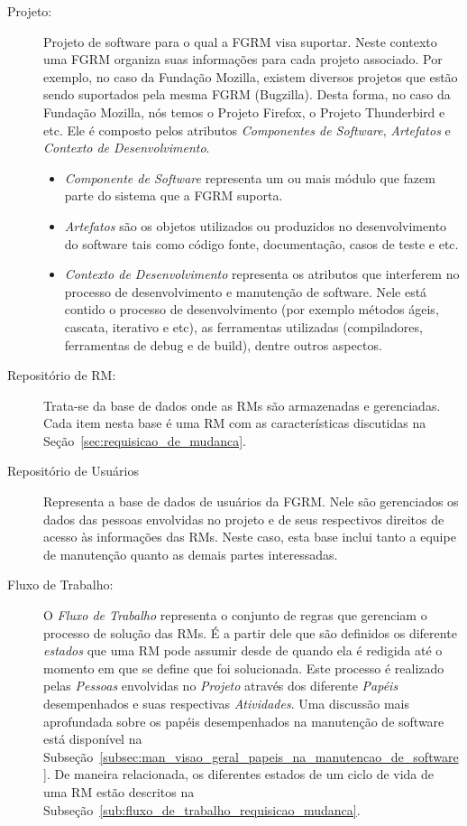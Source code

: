 \begin{description}
    \item[Projeto:] Projeto de software para o qual a FGRM visa suportar. Neste
        contexto uma FGRM organiza suas informações para cada projeto associado.
        Por exemplo, no caso da Fundação Mozilla, existem diversos projetos que
        estão sendo suportados pela mesma FGRM (Bugzilla). Desta forma, no caso
        da Fundação Mozilla, nós temos o Projeto Firefox, o Projeto Thunderbird
        e etc. Ele é composto pelos atributos \textit{Componentes de Software},
        \textit{Artefatos} e \textit{Contexto de Desenvolvimento}.
		\begin{itemize}
			\item  \textit{Componente de Software} representa um ou mais módulo
				que fazem parte do sistema que a FGRM suporta.
			\item \textit{Artefatos} são os objetos utilizados ou produzidos no
				desenvolvimento do software tais como código fonte,
				documentação, casos de teste e etc.
			\item \textit{Contexto de Desenvolvimento} representa os atributos
				que interferem no processo de desenvolvimento e manutenção de
				software. Nele está contido o processo de desenvolvimento (por
				exemplo métodos ágeis, cascata, iterativo e etc), as ferramentas
				utilizadas (compiladores, ferramentas de debug e de build), dentre
                outros aspectos.
		\end{itemize}
	\item[Repositório de RM:] Trata-se da base de dados onde as RMs são
		armazenadas e gerenciadas. Cada item nesta base é uma RM com as
		características discutidas na Seção~\ref{sec:requisicao_de_mudanca}.
    \item[Repositório de Usuários] Representa a base de dados de usuários da
        FGRM\@. Nele são gerenciados os dados das pessoas envolvidas no projeto
        e de seus respectivos direitos de acesso às informações das RMs. Neste
        caso, esta base inclui tanto a equipe de manutenção quanto as demais
        partes interessadas.
	\item[Fluxo de Trabalho:] O \textit{Fluxo de Trabalho} representa o conjunto
		de regras que gerenciam o processo de solução das RMs\@. É a partir
		dele que são definidos os diferente \textit{estados} que uma RM pode
		assumir desde de quando ela é redigida até o momento em que se define
		que foi solucionada. Este processo é realizado pelas \textit{Pessoas}
		envolvidas no \textit{Projeto} através dos diferente \textit{Papéis}
		desempenhados e suas respectivas \textit{Atividades}. Uma discussão mais
		aprofundada sobre os papéis desempenhados na manutenção de software está
		disponível na
		Subseção~\ref{subsec:man_visao_geral_papeis_na_manutencao_de_software}.
		De maneira relacionada, os diferentes estados de um ciclo de vida de uma
		RM estão descritos na
		Subseção~\ref{sub:fluxo_de_trabalho_requisicao_mudanca}.
\end{description}

